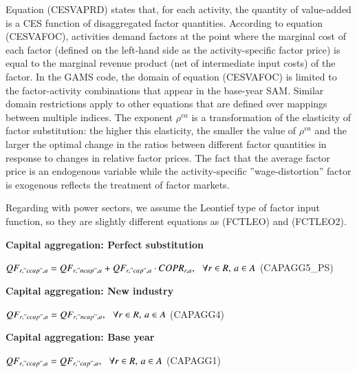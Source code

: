 \documentclass[10pt,a4paper,titlepage,dvipdfmx]{book}
\begin{document}
Equation (CESVAPRD) states that, for each activity, the quantity of value-added is a CES function of disaggregated factor quantities. According to equation (CESVAFOC), activities demand factors at the point where the marginal cost of each factor (defined on the left-hand side as the activity-specific factor price) is equal to the marginal revenue product (net of intermediate input costs) of the factor. In the GAMS code, the domain of equation (CESVAFOC) is limited to the factor-activity combinations that appear in the base-year SAM. Similar domain restrictions apply to other equations that are defined over mappings between multiple indices. The exponent $\rho ^{va}$ is a transformation of the elasticity of factor substitution: the higher this elasticity, the smaller the value of $\rho ^{va}$ and the larger the optimal change in the ratios between different factor quantities in response to changes in relative factor prices. The fact that the average factor price is an endogenous variable while the activity-specific ''wage-distortion'' factor is exogenous reflects the treatment of factor markets.

Regarding with power sectors, we assume the Leontief type of factor input function, so they are slightly different equations as (FCTLEO) and (FCTLEO2).

\begin{flushleft}\textbf{Capital aggregation: Perfect substitution}\end{flushleft}


\begin{center}$QF_{r,"ccap",a}=QF_{r,"ncap",a}+QF_{r,"cap",a}\cdot COPR_{r,a},\,\,\,\,\forall r\in R,\,a\in A$ (CAPAGG5\_PS)
\end{center}

\begin{flushleft}\textbf{Capital aggregation: New industry}\end{flushleft}


\begin{center}$QF_{r,"ccap",a}=QF_{r,"ncap",a},\,\,\,\,\forall r\in R,\,a\in A$ (CAPAGG4)
\end{center}

\begin{flushleft}\textbf{Capital aggregation: Base year }\end{flushleft}


\begin{center}$QF_{r,"ccap",a}=QF_{r,"cap",a},\,\,\,\,\forall r\in R,\,a\in A$ (CAPAGG1)
\end{center}
\end{document}
